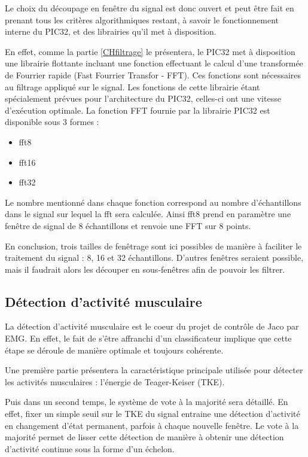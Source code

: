 \documentclass[letterpaper, twoside, 12pt, memoire, creativecommons, hyperref]{thETS}
\begin{document}
Le choix du découpage en fenêtre du signal est donc ouvert et peut être fait en prenant tous les critères algorithmiques restant, à savoir le fonctionnement interne du PIC32, et des librairies qu'il met à disposition. 

En effet, comme la partie \ref{CHfiltrage} le présentera, le PIC32 met à disposition une librairie flottante incluant une fonction effectuant le calcul d'une transformée de Fourrier rapide (Fast Fourrier Transfor - FFT). Ces fonctions sont nécessaires au filtrage appliqué sur le signal. Les fonctions de cette librairie étant spécialement prévues pour l'architecture du PIC32, celles-ci ont une vitesse d'exécution optimale. La fonction FFT fournie par la librairie PIC32 est disponible sous 3 formes : 

\begin{itemize}
 \item fft8
 \item fft16
 \item fft32
\end{itemize}

Le nombre mentionné dans chaque fonction correspond au nombre d'échantillons dans le signal sur lequel la fft sera calculée. Ainsi fft8 prend en paramètre une fenêtre de signal de 8 échantillons et renvoie une FFT sur 8 points.

En conclusion, trois tailles de fenêtrage sont ici possibles de manière à faciliter le traitement du signal : 8, 16 et 32 échantillons. D'autres fenêtres seraient possible, mais il faudrait alors les découper en sous-fenêtres afin de pouvoir les filtrer. 

\subsection{Détection d'activité musculaire}\label{CHdetect}

La détection d'activité musculaire est le coeur du projet de contrôle de Jaco par EMG. En effet, le fait de s'être affranchi d'un classificateur implique que cette étape se déroule de manière optimale et toujours cohérente.

Une première partie présentera la caractéristique principale utilisée pour détecter les activités musculaires : l'énergie de Teager-Keiser (TKE). 

Puis dans un second temps, le système de vote à la majorité sera détaillé. En effet, fixer un simple seuil sur le TKE du signal entraine une détection d'activité en changement d'état permanent, parfois à chaque nouvelle fenêtre. Le vote à la majorité permet de lisser cette détection de manière à obtenir une détection d'activité continue sous la forme d'un échelon.
\end{document}
